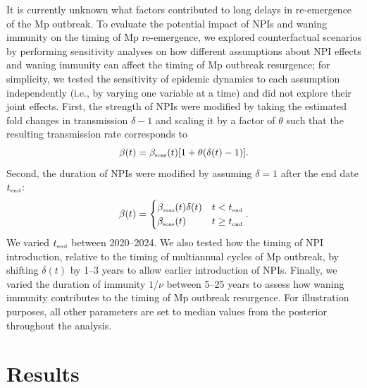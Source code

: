 \documentclass[12pt]{article}
\newcommand{\tsub}[2]{#1_{{\textrm{\tiny #2}}}}
\begin{document}
It is currently unknown what factors contributed to long delays in re-emergence of the Mp outbreak.
To evaluate the potential impact of NPIs and waning immunity on the timing of Mp re-emergence, we explored counterfactual scenarios by performing sensitivity analyses on how different assumptions about NPI effects and waning immunity can affect the timing of Mp outbreak resurgence; 
for simplicity, we tested the sensitivity of epidemic dynamics to each assumption independently (i.e., by varying one variable at a time) and did not explore their joint effects.
First, the strength of NPIs were modified by taking the estimated fold changes in transmission $\delta-1$ and scaling it by a factor of $\theta$ such that the resulting transmission rate corresponds to
\begin{equation}
\beta(t) = \tsub{\beta}{seas}(t) [1+\theta (\delta(t)-1)].
\end{equation}
Second, the duration of NPIs were modified by assuming $\delta = 1$ after the end date $\tsub{t}{end}$:
\begin{equation}
\beta(t) = \begin{cases}
\tsub{\beta}{seas}(t) \delta(t) & t <  \tsub{t}{end}\\
\tsub{\beta}{seas}(t) & t \geq \tsub{t}{end}
\end{cases}.
\end{equation}
We varied $\tsub{t}{end}$ between 2020--2024.
We also tested how the timing of NPI introduction, relative to the timing of multiannual cycles of Mp outbreak, by shifting $\delta(t)$ by 1--3 years to allow earlier introduction of NPIs.
Finally, we varied the duration of immunity $1/\nu$ between 5--25 years to assess how waning immunity contributes to the timing of Mp outbreak resurgence.
For illustration purposes, all other parameters are set to median values from the posterior throughout the analysis.

\section{Results}
\end{document}
